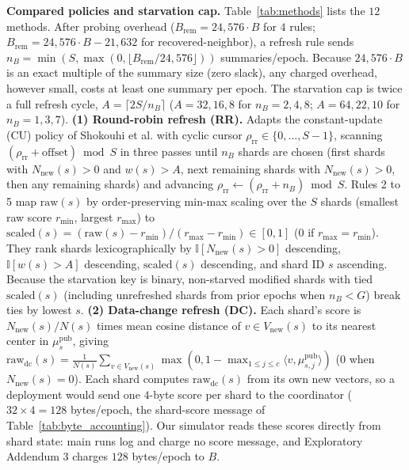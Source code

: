 \textbf{Compared policies and starvation cap.} Table~\ref{tab:methods} lists the $12$ methods. After probing overhead ($B_{\text{rem}} = 24{,}576 \cdot B$ for $4$ rules; $B_{\text{rem}} = 24{,}576 \cdot B - 21{,}632$ for recovered-neighbor), a refresh rule sends $n_B = \min(S, \max(0, \lfloor B_{\text{rem}} / 24{,}576 \rfloor))$ summaries/epoch. Because $24{,}576 \cdot B$ is an exact multiple of the summary size (zero slack), any charged overhead, however small, costs at least one summary per epoch. The starvation cap is twice a full refresh cycle, $A = \lceil 2S / n_B \rceil$ ($A = 32, 16, 8$ for $n_B = 2, 4, 8$; $A = 64, 22, 10$ for $n_B = 1, 3, 7$). \textbf{(1) Round-robin refresh (RR).} Adapts the constant-update (CU) policy of Shokouhi et al. \cite{shokouhi2007updating} with cyclic cursor $\rho_{\text{rr}} \in \{0, \dots, S-1\}$, scanning $(\rho_{\text{rr}} + \text{offset}) \bmod S$ in three passes until $n_B$ shards are chosen (first shards with $N_{\text{new}}(s) > 0$ and $w(s) > A$, next remaining shards with $N_{\text{new}}(s) > 0$, then any remaining shards) and advancing $\rho_{\text{rr}} \leftarrow (\rho_{\text{rr}} + n_B) \bmod S$. Rules 2 to 5 map $\text{raw}(s)$ by order-preserving min-max scaling over the $S$ shards (smallest raw score $r_{\min}$, largest $r_{\max}$) to $\text{scaled}(s) = (\text{raw}(s) - r_{\min}) / (r_{\max} - r_{\min}) \in [0, 1]$ ($0$ if $r_{\max} = r_{\min}$). They rank shards lexicographically by $\mathbb{I}[N_{\text{new}}(s) > 0]$ descending, $\mathbb{I}[w(s) > A]$ descending, $\text{scaled}(s)$ descending, and shard ID $s$ ascending. Because the starvation key is binary, non-starved modified shards with tied $\text{scaled}(s)$ (including unrefreshed shards from prior epochs when $n_B < G$) break ties by lowest $s$. \textbf{(2) Data-change refresh (DC).} Each shard's score is $N_{\text{new}}(s)/N(s)$ times mean cosine distance of $v \in V_{\text{new}}(s)$ to its nearest center in $\mu_s^{\text{pub}}$, giving $\text{raw}_{\text{dc}}(s) = \frac{1}{N(s)} \sum_{v \in V_{\text{new}}(s)} \max(0, 1 - \max_{1 \le j \le c} \langle v, \mu_{s,j}^{\text{pub}} \rangle)$ ($0$ when $N_{\text{new}}(s) = 0$). Each shard computes $\text{raw}_{\text{dc}}(s)$ from its own new vectors, so a deployment would send one $4$-byte score per shard to the coordinator ($32 \times 4 = 128$ bytes/epoch, the shard-score message of Table~\ref{tab:byte_accounting}). Our simulator reads these scores directly from shard state: main runs log and charge no score message, and Exploratory Addendum 3 charges $128$ bytes/epoch to $B$.

